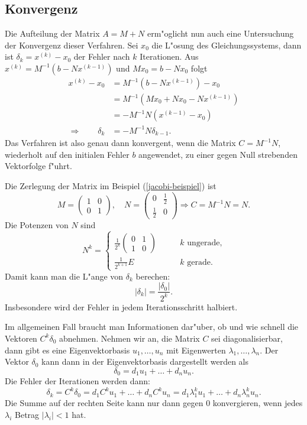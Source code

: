 \subsection{Konvergenz\label{section-konvergenz}}
Die Aufteilung der Matrix $A=M+N$ erm"oglicht nun auch eine Untersuchung
der Konvergenz dieser Verfahren.
Sei $x_0$ die L"osung des Gleichungssystems, dann ist $\delta_k=x^{(k)}-x_0$ der Fehler
nach $k$ Iterationen.
Aus $x^{(k)} = M^{-1}(b-Nx^{(k-1)})$ und $Mx_0 =b-Nx_0$ folgt
\begin{align*}
x^{(k)}-x_0
&=M^{-1}(b-Nx^{(k-1)})-x_0\\
&=M^{-1}(Mx_0+Nx_0-Nx^{(k-1)})\\
&=-M^{-1}N(x^{(k-1)}-x_0)\\
\Rightarrow\qquad \delta_k&=-M^{-1}N\delta_{k-1}.
\end{align*}
Das Verfahren ist also genau dann konvergent, wenn die Matrix
$C=M^{-1}N$, wiederholt auf den initialen Fehler $b$ angewendet,
zu einer gegen Null strebenden Vektorfolge f"uhrt.

Die Zerlegung der Matrix im Beispiel (\ref{jacobi-beispiel}) ist
\[
M=\begin{pmatrix}1&0\\0&1\end{pmatrix},\quad
N=\begin{pmatrix}0&\frac12\\\frac12&0\end{pmatrix}\Rightarrow
C=M^{-1}N=N.
\]
Die Potenzen von $N$ sind 
\[
N^k=\begin{cases}
{\displaystyle\frac1{2^k}}
\begin{pmatrix}0&1\\1&0\end{pmatrix}
&\qquad \text{$k$ ungerade,}\\
{\displaystyle \frac1{2^{k+1}}}E&\qquad \text{$k$ gerade.}
\end{cases}
\]
Damit kann man die L"ange von $\delta_k$ berechen:
\[
|\delta_k|=\frac{|\delta_0|}{2^k}.
\]
Insbesondere wird der Fehler in jedem Iterationsschritt halbiert.

Im allgemeinen Fall braucht man Informationen dar"uber, ob und wie
schnell die Vektoren $C^k\delta_0$ abnehmen.
Nehmen wir an, die Matrix $C$ sei diagonalisierbar, dann gibt es
eine Eigenvektorbasis $u_1,\dots,u_n$ mit Eigenwerten
$\lambda_1,\dots,\lambda_n$. Der Vektor $\delta_0$ kann dann in der
Eigenvektorbasis dargestellt werden als
\[
\delta_0=d_1u_1+\dots+d_nu_n.
\]
Die Fehler der Iterationen werden dann:
\[
\delta_k
=
C^k\delta_0
=
d_1C^ku_1+\dots+d_nC^ku_n
=
d_1\lambda_1^ku_1+\dots+d_n\lambda_n^ku_n.
\]
Die Summe auf der rechten Seite kann nur dann gegen 0 konvergieren, wenn
jedes $\lambda_i$ Betrag $|\lambda_i|<1$ hat. 

